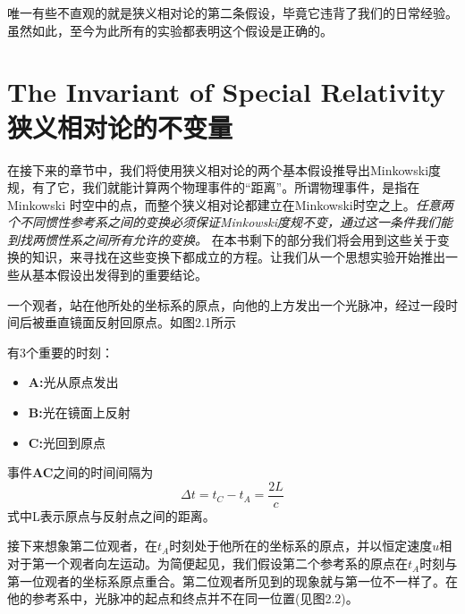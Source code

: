 唯一有些不直观的就是狭义相对论的第二条假设，毕竟它违背了我们的日常经验。虽然如此，至今为此所有的实验都表明这个假设是正确的。


\section[狭义相对论的不变量]{The Invariant of Special Relativity 狭义相对论的不变量}
\label{sec2.1}
在接下来的章节中，我们将使用狭义相对论的两个基本假设推导出Minkowski度规，有了它，我们就能计算两个物理事件的“距离”。所谓物理事件，是指在Minkowski 时空中的点，而整个狭义相对论都建立在Minkowski时空之上。{\it{任意两个不同惯性参考系之间的变换必须保证Minkowski度规不变，通过这一条件我们能到找两惯性系之间所有允许的变换。}}
在本书剩下的部分我们将会用到这些关于变换的知识，来寻找在这些变换下都成立的方程。让我们从一个思想实验开始推出一些从基本假设出发得到的重要结论。

{}

一个观者，站在他所处的坐标系的原点，向他的上方发出一个光脉冲，经过一段时间后被垂直镜面反射回原点。如图2.1所示

有3个重要的时刻：
\begin{itemize}
	\item {\bf{A:}}光从原点发出
	\item {\bf{B:}}光在镜面上反射
	\item {\bf{C:}}光回到原点
\end{itemize}
事件{\bf{AC}}之间的时间间隔为
\begin{equation}\label{eq2.1}
\Delta t=t_C-t_A=\frac{2L}{c}
\end{equation}
式中L表示原点与反射点之间的距离。

{}

接下来想象第二位观者，在$t_A$时刻处于他所在的坐标系的原点，并以恒定速度$u$相对于第一个观者向左运动。为简便起见，我们假设第二个参考系的原点在$t_A$时刻与第一位观者的坐标系原点重合。第二位观者所见到的现象就与第一位不一样了。在他的参考系中，光脉冲的起点和终点并不在同一位置(见图2.2)。




